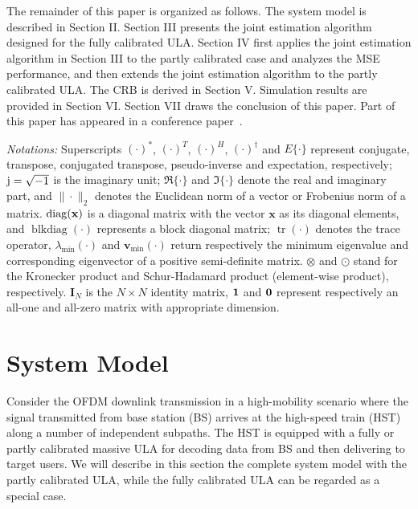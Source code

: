 \documentclass[12pt, draftclsnofoot, onecolumn]{IEEEtran}
\begin{document}
The remainder of this paper is organized as follows. The system model is described in Section II. Section III presents the joint estimation algorithm designed for the fully calibrated ULA. Section IV first applies the joint estimation algorithm in Section III to the partly calibrated case and analyzes the MSE performance, and then extends the joint estimation algorithm to the partly calibrated ULA. The CRB is derived in Section V. Simulation results are provided in Section VI. Section VII draws the conclusion of this paper. Part of this paper has appeared in a conference paper~\cite{Y_GE2017VTCSpring}.

\textit{Notations:} Superscripts $(\cdot)^*$, $(\cdot)^T$, $(\cdot)^H$, $(\cdot)^\dag$ and $E{\{\cdot\}}$
represent conjugate, transpose, conjugated transpose, pseudo-inverse and expectation, respectively; ${\rm j}=\sqrt{-1}$ is the imaginary unit; $\mathbf{\Re} \{\cdot\}$ and $\mathbf{\Im} \{\cdot\}$ denote the real and imaginary part, and $\|\cdot\|_{2}$ denotes the Euclidean norm of a vector or Frobenius norm of a matrix. $\operatorname{diag}(\bf x)$ is a diagonal matrix with the vector $\mathbf{x}$ as its diagonal elements, and $\operatorname{blkdiag}(\cdot)$ represents a block diagonal matrix; $\operatorname{tr}(\cdot)$ denotes the trace operator, $\lambda_{\textrm{min}}(\cdot)$ and ${\mathbf{v}}_{\min }(\cdot)$ return respectively the minimum eigenvalue and corresponding eigenvector of a positive semi-definite matrix.
$\otimes$ and $\odot$ stand for the Kronecker product and Schur-Hadamard product (element-wise product), respectively. ${\mathbf{I}_N}$ is the $N\times N$ identity matrix, ${\bf 1}$ and ${\bf 0}$ represent respectively an all-one and all-zero matrix with appropriate dimension.


\vspace{-0.6em}
\section{System Model}
Consider the OFDM downlink transmission in a high-mobility scenario where the signal transmitted from base station (BS) arrives at the high-speed train (HST) along a number of independent subpaths. The HST is equipped with a fully or partly calibrated massive ULA for decoding data from BS and then delivering to target users. We will describe in this section the complete system model with the partly calibrated ULA, while the fully calibrated ULA can be regarded as a special case.
\end{document}
